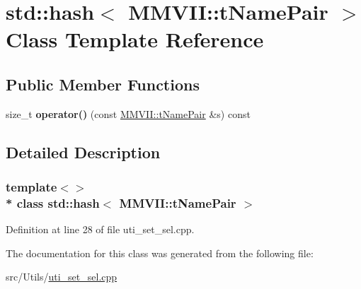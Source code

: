 \hypertarget{classstd_1_1hash_3_01MMVII_1_1tNamePair_01_4}{}\section{std\+:\+:hash$<$ M\+M\+V\+II\+:\+:t\+Name\+Pair $>$ Class Template Reference}
\label{classstd_1_1hash_3_01MMVII_1_1tNamePair_01_4}
\subsection*{Public Member Functions}
\begin{DoxyCompactItemize}
\item 
size\+\_\+t {\bfseries operator()} (const \hyperlink{MMVII__AllClassDeclare_8h_a7b6dc8a09571e6038f08b8f7fa07b8b9}{M\+M\+V\+I\+I\+::t\+Name\+Pair} \&s) const \hypertarget{classstd_1_1hash_3_01MMVII_1_1tNamePair_01_4_a0596bbdde80457c64d2a36eac4ea006a}{}\label{classstd_1_1hash_3_01MMVII_1_1tNamePair_01_4_a0596bbdde80457c64d2a36eac4ea006a}

\end{DoxyCompactItemize}


\subsection{Detailed Description}
\subsubsection*{template$<$$>$\\*
class std\+::hash$<$ M\+M\+V\+I\+I\+::t\+Name\+Pair $>$}



Definition at line 28 of file uti\+\_\+set\+\_\+sel.\+cpp.



The documentation for this class was generated from the following file\+:\begin{DoxyCompactItemize}
\item 
src/\+Utils/\hyperlink{uti__set__sel_8cpp}{uti\+\_\+set\+\_\+sel.\+cpp}\end{DoxyCompactItemize}
